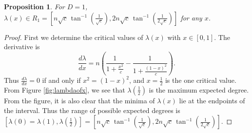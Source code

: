 \documentclass[a4paper,10pt]{article}
\newtheorem{prop}{Proposition}
\begin{document}
\begin{prop}
\label{prop:R1}
 For $D=1$, $\lambda(x) \in R_1 = \left[n \sqrt{c}\, \tan^{-1}\left(\frac{1}{\sqrt{c}}\right),2 n\sqrt{c}\,  \tan^{-1}\left(\frac{1}{2 \sqrt{c}}\right)\right]$ for any $x$.
 \end{prop}
\begin{proof}
First we determine the critical values of $\lambda(x)$ with $x \in [0, 1]$. The derivative is
\begin{equation}
 \frac{d\lambda}{dx} = n\left(\frac{1}{1+\frac{x^2}{c}} - \frac{1}{1+\frac{(1-x)^2}{c}} \right).
\end{equation}
Thus $\frac{d\lambda}{dx} = 0$ if and only if $x^2 = (1 - x)^2$, and $x=\frac{1}{2}$ is the one critical value. From Figure \ref{fig:lambdaofx}, we see that $\lambda(\frac{1}{2})$ is the maximum expected degree. From the figure, it is also clear that the minima of $\lambda(x)$ lie at the endpoints of the interval. Thus the range of possible expected degrees is 
$[\lambda(0)=\lambda(1), \lambda(\frac{1}{2})] = \left[n \sqrt{c}\, \tan^{-1}\left(\frac{1}{\sqrt{c}}\right),2 n\sqrt{c}\,  \tan^{-1}\left(\frac{1}{2 \sqrt{c}}\right)\right]$. 
\end{proof}
\end{document}
